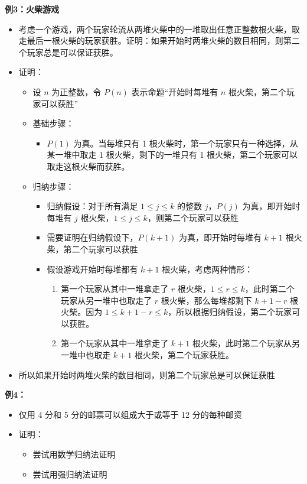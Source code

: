 \documentclass[UTF8]{report}
\theoremstyle{MyLineTheoremStyle} %
\theoremstyle{MyBlockTheoremStyle} %
\theoremstyle{MySubsubsectionStyle} %
\begin{document}
        \textbf{例3：火柴游戏}
        \begin{itemize}
            \item 考虑一个游戏，两个玩家轮流从两堆火柴中的一堆取出任意正整数根火柴，取走最后一根火柴的玩家获胜。证明：如果开始时两堆火柴的数目相同，则第二个玩家总是可以保证获胜。
            \item 证明：
            \begin{itemize}
                \item 设 $n$ 为正整数，令 $P(n)$ 表示命题“开始时每堆有 $n$ 根火柴，第二个玩家可以获胜”
                \item 基础步骤：
                \begin{itemize}
                    \item $P(1)$ 为真。当每堆只有 1 根火柴时，第一个玩家只有一种选择，从某一堆中取走 1 根火柴，剩下的一堆只有 1 根火柴，第二个玩家可以取走这根火柴而获胜。
                \end{itemize}
                \item 归纳步骤：
                \begin{itemize}
                    \item 归纳假设：对于所有满足 $1 \leq j \leq k$ 的整数 $j$，$P(j)$ 为真，即开始时每堆有 $j$ 根火柴，$1 \leq j \leq k$，则第二个玩家可以获胜
                    \item 需要证明在归纳假设下，$P(k+1)$ 为真，即开始时每堆有 $k+1$ 根火柴，第二个玩家可以获胜
                    \item 假设游戏开始时每堆都有 $k+1$ 根火柴，考虑两种情形：
                    \begin{enumerate}
                        \item 第一个玩家从其中一堆拿走了 $r$ 根火柴，$1 \leq r \leq k$，此时第二个玩家从另一堆中也取走了 $r$ 根火柴，那么每堆都剩下 $k+1-r$ 根火柴。因为 $1 \leq k+1-r \leq k$，所以根据归纳假设，第二个玩家可以获胜。
                        \item 第一个玩家从其中一堆拿走了 $k+1$ 根火柴，此时第二个玩家从另一堆中也取走 $k+1$ 根火柴，第二个玩家获胜。
                    \end{enumerate}
                \end{itemize}
            \end{itemize}
            \item 所以如果开始时两堆火柴的数目相同，则第二个玩家总是可以保证获胜
        \end{itemize}
        
        \textbf{例4：}
        \begin{itemize}
            \item 仅用 4 分和 5 分的邮票可以组成大于或等于 12 分的每种邮资
            \item 证明：
            \begin{itemize}
                \item 尝试用数学归纳法证明
                \item 尝试用强归纳法证明
            \end{itemize}
        \end{itemize}
        
\end{document}
